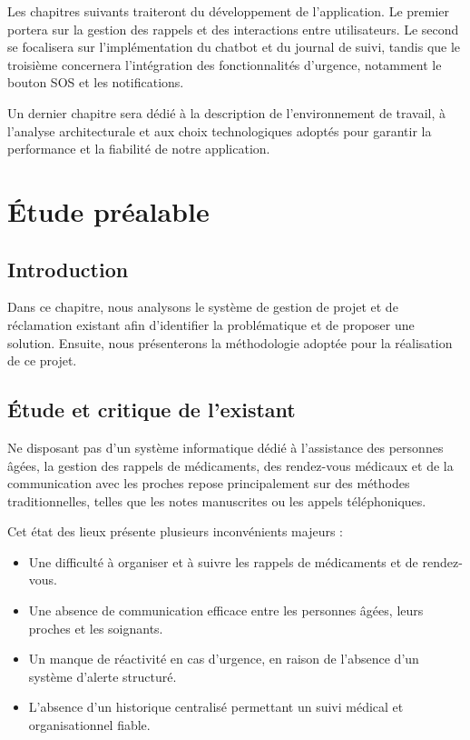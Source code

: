 \documentclass[12pt,a4paper]{report}
\begin{document}
Les chapitres suivants traiteront du développement de l’application. Le premier portera sur la gestion des rappels et des interactions entre utilisateurs. Le second se focalisera sur l’implémentation du chatbot et du journal de suivi, tandis que le troisième concernera l’intégration des fonctionnalités d’urgence, notamment le bouton SOS et les notifications.

Un dernier chapitre sera dédié à la description de l’environnement de travail, à l’analyse architecturale et aux choix technologiques adoptés pour garantir la performance et la fiabilité de notre application.

\chapter{Étude préalable}

\section{Introduction}

Dans ce chapitre, nous analysons le système de gestion de projet et de réclamation existant afin d'identifier la problématique et de proposer une solution. Ensuite, nous présenterons la méthodologie adoptée pour la réalisation de ce projet.

\section{Étude et critique de l’existant}

Ne disposant pas d’un système informatique dédié à l’assistance des personnes âgées, la gestion des rappels de médicaments, des rendez-vous médicaux et de la communication avec les proches repose principalement sur des méthodes traditionnelles, telles que les notes manuscrites ou les appels téléphoniques.

Cet état des lieux présente plusieurs inconvénients majeurs :

\begin{itemize}
    \item Une difficulté à organiser et à suivre les rappels de médicaments et de rendez-vous.
    \item Une absence de communication efficace entre les personnes âgées, leurs proches et les soignants.
    \item Un manque de réactivité en cas d’urgence, en raison de l’absence d’un système d’alerte structuré.
    \item L’absence d’un historique centralisé permettant un suivi médical et organisationnel fiable.
\end{itemize}
\end{document}
